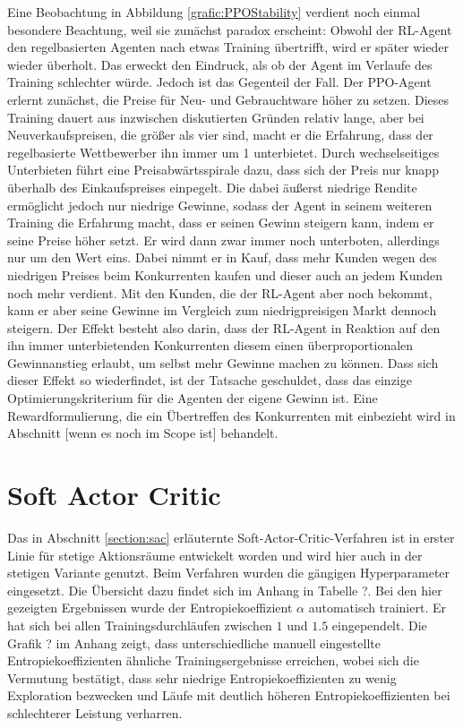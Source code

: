 Eine Beobachtung in Abbildung \ref{grafic:PPOStability} verdient noch einmal besondere Beachtung, weil sie zunächst paradox erscheint:
Obwohl der RL-Agent den regelbasierten Agenten nach etwas Training übertrifft, wird er später wieder wieder überholt.
Das erweckt den Eindruck, als ob der Agent im Verlaufe des Training schlechter würde.
Jedoch ist das Gegenteil der Fall.
Der PPO-Agent erlernt zunächst, die Preise für Neu- und Gebrauchtware höher zu setzen.
Dieses Training dauert aus inzwischen diskutierten Gründen relativ lange, aber bei Neuverkaufspreisen, die größer als vier sind, macht er die Erfahrung, dass der regelbasierte Wettbewerber ihn immer um 1 unterbietet.
Durch wechselseitiges Unterbieten führt eine Preisabwärtsspirale dazu, dass sich der Preis nur knapp überhalb des Einkaufspreises einpegelt.
Die dabei äußerst niedrige Rendite ermöglicht jedoch nur niedrige Gewinne, sodass der Agent in seinem weiteren Training die Erfahrung macht, dass er seinen Gewinn steigern kann, indem er seine Preise höher setzt.
Er wird dann zwar immer noch unterboten, allerdings nur um den Wert eins.
Dabei nimmt er in Kauf, dass mehr Kunden wegen des niedrigen Preises beim Konkurrenten kaufen und dieser auch an jedem Kunden noch mehr verdient.
Mit den Kunden, die der RL-Agent aber noch bekommt, kann er aber seine Gewinne im Vergleich zum niedrigpreisigen Markt dennoch steigern.
Der Effekt besteht also darin, dass der RL-Agent in Reaktion auf den ihn immer unterbietenden Konkurrenten diesem einen überproportionalen Gewinnanstieg erlaubt, um selbst mehr Gewinne machen zu können.
Dass sich dieser Effekt so wiederfindet, ist der Tatsache geschuldet, dass das einzige Optimierungskriterium für die Agenten der eigene Gewinn ist.
Eine Rewardformulierung, die ein Übertreffen des Konkurrenten mit einbezieht wird in Abschnitt [wenn es noch im Scope ist] behandelt.

\section{Soft Actor Critic}
\label{section:main_sac}
Das in Abschnitt \ref{section:sac} erläuternte Soft-Actor-Critic-Verfahren ist in erster Linie für stetige Aktionsräume entwickelt worden und wird hier auch in der stetigen Variante genutzt.
Beim Verfahren wurden die gängigen Hyperparameter eingesetzt.
Die Übersicht dazu findet sich im Anhang in Tabelle ?.
Bei den hier gezeigten Ergebnissen wurde der Entropiekoeffizient $\alpha$ automatisch trainiert.
Er hat sich bei allen Trainingsdurchläufen zwischen $1$ und $1.5$ eingependelt.
Die Grafik ? im Anhang zeigt, dass unterschiedliche manuell eingestellte Entropiekoeffizienten ähnliche Trainingsergebnisse erreichen, wobei sich die Vermutung bestätigt, dass sehr niedrige Entropiekoeffizienten zu wenig Exploration bezwecken und Läufe mit deutlich höheren Entropiekoeffizienten bei schlechterer Leistung verharren.

